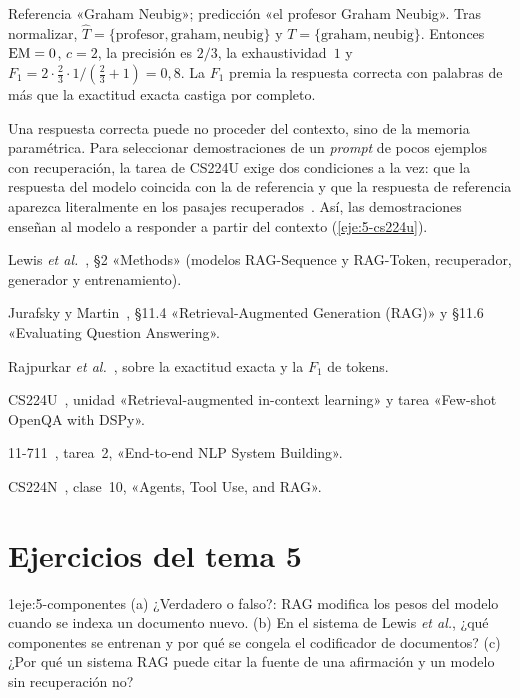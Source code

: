 \begin{ejemplo}\label{ej:f1}
Referencia «Graham Neubig»; predicción «el profesor Graham Neubig». Tras normalizar, $\hat T=\{\text{profesor},\text{graham},\text{neubig}\}$ y $T=\{\text{graham},\text{neubig}\}$. Entonces $\operatorname{EM}=0$, $c=2$, la precisión es $2/3$, la exhaustividad~$1$ y $F_1=2\cdot\frac23\cdot 1/(\frac23+1)=0{,}8$. La $F_1$ premia la respuesta correcta con palabras de más que la exactitud exacta castiga por completo.
\end{ejemplo}

\begin{observacion}
Una respuesta correcta puede no proceder del contexto, sino de la memoria paramétrica. Para seleccionar demostraciones de un \emph{prompt} de pocos ejemplos con recuperación, la tarea de CS224U exige dos condiciones a la vez: que la respuesta del modelo coincida con la de referencia y que la respuesta de referencia aparezca literalmente en los pasajes recuperados~\cite{cs224u}. Así, las demostraciones enseñan al modelo a responder a partir del contexto (\cref{eje:5-cs224u}).
\end{observacion}

\begin{lecturas}
\item Lewis \emph{et al.}~\cite{rag}, §2 «Methods» (modelos RAG-Sequence y RAG-Token, recuperador, generador y entrenamiento).
\item Jurafsky y Martin~\cite{jm3}, §11.4 «Retrieval-Augmented Generation (RAG)» y §11.6 «Evaluating Question Answering».
\item Rajpurkar \emph{et al.}~\cite{squad}, sobre la exactitud exacta y la $F_1$ de tokens.
\item CS224U~\cite{cs224u}, unidad «Retrieval-augmented in-context learning» y tarea «Few-shot OpenQA with DSPy».
\item 11-711~\cite{cmu711}, tarea~2, «End-to-end NLP System Building».
\item CS224N~\cite{cs224n}, clase~10, «Agents, Tool Use, and RAG».
\end{lecturas}

\section*{Ejercicios del tema 5}

\begin{ejercicio}{1}{eje:5-componentes}
(a) ¿Verdadero o falso?: RAG modifica los pesos del modelo cuando se indexa un documento nuevo. (b) En el sistema de Lewis \emph{et al.}, ¿qué componentes se entrenan y por qué se congela el codificador de documentos? (c) ¿Por qué un sistema RAG puede citar la fuente de una afirmación y un modelo sin recuperación no?
\end{ejercicio}

